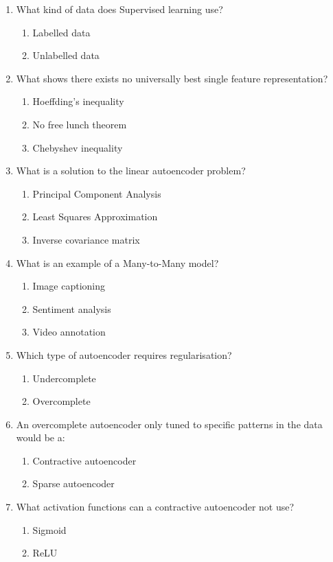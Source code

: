 \documentclass{report}
\numberwithin{equation}{section}
\begin{document}
\begin{enumerate}
\item What kind of data does Supervised learning use?
\begin{enumerate}[label=\alph*.]
\item Labelled data
\item Unlabelled data
\end{enumerate}
\item What shows there exists no universally best single feature representation?
\begin{enumerate}[label=\alph*.]
\item Hoeffding's inequality
\item No free lunch theorem
\item Chebyshev inequality
\end{enumerate}
\item What is a solution to the linear autoencoder problem?
\begin{enumerate}[label=\alph*.]
\item Principal Component Analysis
\item Least Squares Approximation
\item Inverse covariance matrix
\end{enumerate}
\item What is an example of a Many-to-Many model?
\begin{enumerate}[label=\alph*.]
\item Image captioning
\item Sentiment analysis
\item Video annotation
\end{enumerate}
\item Which type of autoencoder requires regularisation?
\begin{enumerate}[label=\alph*.]
\item Undercomplete
\item Overcomplete
\end{enumerate}
\item An overcomplete autoencoder only tuned to specific patterns in the data would be a:
\begin{enumerate}[label=\alph*.]
\item Contractive autoencoder
\item Sparse autoencoder
\end{enumerate}
\item What activation functions can a contractive autoencoder not use?
\begin{enumerate}[label=\alph*.]
\item Sigmoid
\item ReLU


\end{enumerate}
\end{enumerate}
\end{document}
